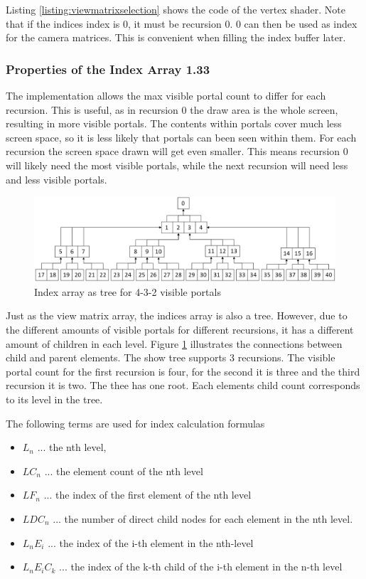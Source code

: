 Listing \ref{listing:viewmatrixselection} shows the code of the vertex shader. Note that if the indices index is 0, it must be recursion 0. 0 can then be used as index for the camera matrices. This is convenient when filling the index buffer later.

\subsubsection{Properties of the Index Array 1.33}
\label{section:indexarrayproperties}

The implementation allows the max visible portal count to differ for each recursion. This is useful, as in recursion 0 the draw area is the whole screen, resulting in more visible portals. The contents within portals cover much less screen space, so it is less likely that portals can been seen within them. For each recursion the screen space drawn will get even smaller. This means recursion 0 will likely need the most visible portals, while the next recursion will need less and less visible portals.

\begin{figure}[h]
	\includegraphics[width=\linewidth]{images/indexarray.png}
	\caption{Index array as tree for 4-3-2 visible portals}
	\label{fig:indexarray}
\end{figure}

Just as the view matrix array, the indices array is also a tree. However, due to the different amounts of visible portals for different recursions, it has a different amount of children in each level. Figure \ref{fig:indexarray} illustrates the connections between child and parent elements. The show tree supports 3 recursions. The visible portal count for the first recursion is four, for the second it is three and the third recursion it is two. The thee has one root. Each elements child count corresponds to its level in the tree.

The following terms are used for index calculation formulas
\begin{itemize}
	\item $L_n$ ... the nth level,
	\item $LC_n$ ... the element count of the nth level
	\item $LF_n$ ... the index of the first element of the nth level
	\item $LDC_n$ ... the number of direct child nodes for each element in the nth level. 
	\item $L_nE_i$ ... the index of the i-th element in the nth-level
	\item $L_nE_iC_k$ ... the index of the k-th child of the i-th element in the n-th level 
\end{itemize}

